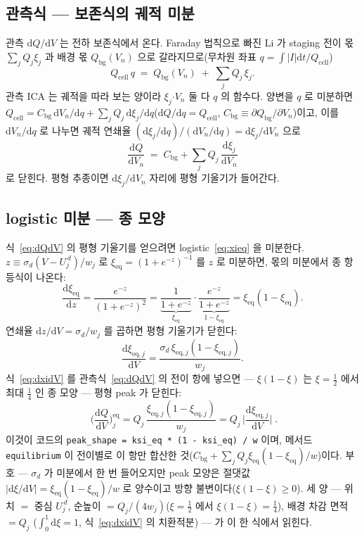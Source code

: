 \documentclass[11pt,a4paper]{article}
\newcommand{\dd}{\mathrm{d}}
\newcommand{\eq}{\mathrm{eq}}
\newcommand{\cell}{\mathrm{cell}}
\newcommand{\bg}{\mathrm{bg}}
\newcommand{\code}[1]{\texttt{#1}}
\begin{document}
\subsection{관측식 — 보존식의 궤적 미분}
관측 $\dd Q/\dd V$ 는 전하 보존식에서 온다. Faraday 법칙으로 빠진 Li 가 staging 전이 몫 $\sum_jQ_j\xi_j$ 과 배경 몫
$Q_\bg(V_n)$ 으로 갈라지므로(무차원 좌표 $q=\int|I|\dd t/Q_\cell$)
\begin{equation}
Q_\cell\,q\;=\;Q_\bg(V_n)\;+\;\sum_jQ_j\,\xi_j.
\label{eq:charge}
\end{equation}
관측 ICA 는 궤적을 따라 보는 양이라 $\xi_j$$\cdot$$V_n$ 둘 다 $q$ 의 함수다. 양변을 $q$ 로 미분하면
$Q_\cell=C_\bg\,\dd V_n/\dd q+\sum_jQ_j\,\dd\xi_j/\dd q$($\dd Q/\dd q=Q_\cell$, $C_\bg\equiv\partial Q_\bg/\partial V_n$)이고,
이를 $\dd V_n/\dd q$ 로 나누면 궤적 연쇄율 $(\dd\xi_j/\dd q)/(\dd V_n/\dd q)=\dd\xi_j/\dd V_n$ 으로
\begin{equation}
\frac{\dd Q}{\dd V_n}\;=\;C_\bg+\sum_jQ_j\,\frac{\dd\xi_j}{\dd V_n}
\label{eq:dQdV}
\end{equation}
로 닫힌다. 평형 추종이면 $\dd\xi_j/\dd V_n$ 자리에 평형 기울기가 들어간다.

\subsection{logistic 미분 — 종 모양}
식~\eqref{eq:dQdV} 의 평형 기울기를 얻으려면 logistic~\eqref{eq:xieq} 을 미분한다. $z\equiv\sigma_d(V-U_j^{\,d})/w_j$ 로
$\xi_\eq=(1+e^{-z})^{-1}$ 를 $z$ 로 미분하면, 몫의 미분에서 종 항등식이 나온다:
\begin{equation}
\frac{\dd\xi_\eq}{\dd z}=\frac{e^{-z}}{(1+e^{-z})^2}
=\underbrace{\frac{1}{1+e^{-z}}}_{\xi_\eq}\cdot
\underbrace{\frac{e^{-z}}{1+e^{-z}}}_{1-\xi_\eq}=\xi_\eq(1-\xi_\eq).
\label{eq:belliden}
\end{equation}
연쇄율 $\dd z/\dd V=\sigma_d/w_j$ 를 곱하면 평형 기울기가 닫힌다:
\begin{equation}
\frac{\dd\xi_{\eq,j}}{\dd V}=\frac{\sigma_d\,\xi_{\eq,j}(1-\xi_{\eq,j})}{w_j}.
\label{eq:dxidV}
\end{equation}
식~\eqref{eq:dxidV} 를 관측식~\eqref{eq:dQdV} 의 전이 항에 넣으면 — $\xi(1-\xi)$ 는 $\xi=\tfrac12$ 에서 최대 $\tfrac14$ 인
종 모양 — 평형 peak 가 닫힌다:
\begin{equation}
\boxed{\;\Big(\frac{\dd Q}{\dd V}\Big)^\eq_j
=Q_j\,\frac{\xi_{\eq,j}(1-\xi_{\eq,j})}{w_j}
=Q_j\,\Big|\frac{\dd\xi_{\eq,j}}{\dd V}\Big|\;.}
\label{eq:eqpeak}
\end{equation}
이것이 코드의 \code{peak\_shape = ksi\_eq * (1 - ksi\_eq) / w} 이며, 메서드 \code{equilibrium} 이 전이별로 이 항만
합산한 것($C_\bg+\sum_jQ_j\xi_\eq(1-\xi_\eq)/w$)이다. 부호 — $\sigma_d$ 가 미분에서 한 번 들어오지만 peak 모양은
절댓값 $|\dd\xi/\dd V|=\xi_\eq(1-\xi_\eq)/w$ 로 양수이고 방향 불변이다($\xi(1-\xi)\ge0$). 세 양 — 위치 $=$ 중심
$U_j^{\,d}$, 순높이 $=Q_j/(4w_j)$($\xi=\tfrac12$ 에서 $\xi(1-\xi)=\tfrac14$), 배경 차감 면적 $=Q_j$
($\int_0^1\dd\xi=1$, 식~\eqref{eq:dxidV} 의 치환적분) — 가 이 한 식에서 읽힌다.
\end{document}
